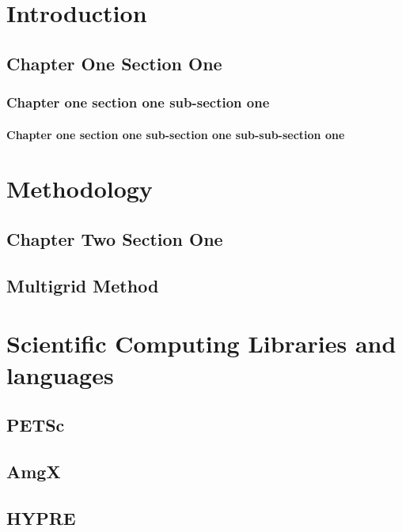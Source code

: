 \chapter{Introduction}
\section{Chapter One Section One}
\subsection{Chapter one section one sub-section one}

\subsubsection{Chapter one section one sub-section one sub-sub-section one}

\chapter{Methodology}
\section{Chapter Two Section One}

\section{Multigrid Method}


\chapter{Scientific Computing Libraries and languages}
\section{PETSc}

\section{AmgX}

\section{HYPRE}


